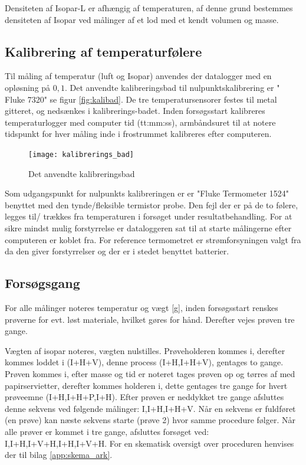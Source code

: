 Densiteten af Isopar-L er afhængig af temperaturen, af denne grund bestemmes densiteten af Isopar ved målinger af et lod med et kendt volumen og masse. 

\subsection{Kalibrering af temperaturfølere}
Til måling af temperatur (luft og Isopar) anvendes der datalogger med en opløsning på $0,1${\celsius}. Det anvendte kalibreringsbad til nulpunktskalibrering  er " Fluke 7320" se figur \vref{fig:kalibad}. De tre temperatursensorer festes til metal gitteret, og nedsænkes i kalibrerings-badet. Inden forsøgsstart kalibreres temperaturlogger med computer tid (tt:mm:ss), armbåndsuret til at notere tidspunkt for hver måling inde i frostrummet kalibreres efter computeren.

%
\begin{figure}
\centering
\texttt{[image: kalibrerings\_bad]}
\caption{Det anvendte kalibreringsbad}
\label{fig:kalibad}
\end{figure}
%

Som udgangspunkt for nulpunkts kalibreringen er er "Fluke Termometer 1524" benyttet med den tynde/fleksible termistor probe. Den fejl der er på de to følere, legges til/ trækkes fra temperaturen i forsøget under resultatbehandling.
For at sikre mindst mulig forstyrrelse er dataloggeren sat til at starte målingerne efter computeren er koblet fra. For reference termometret er strømforsyningen valgt fra da den giver forstyrrelser og der er i stedet benyttet batterier.

\subsection{Forsøgsgang}
For alle målinger noteres temperatur og vægt [g], inden forsøgsstart renskes prøverne for evt. løst materiale, hvilket gøres for hånd. Derefter vejes prøven tre gange.

Vægten af isopar noteres, vægten nulstilles. Prøveholderen kommes i, derefter kommes loddet i (I+H+V), denne process (I+H,I+H+V), gentages to gange. 
Prøven kommes i, efter masse og tid er noteret tages prøven op og tørres af med papirservietter, derefter kommes holderen i, dette gentages tre gange for hvert prøveemne (I+H,I+H+P,I+H).
Efter prøven er neddykket tre gange afsluttes denne sekvens ved følgende målinger: I,I+H,I+H+V. Når en sekvens er fuldføret (en prøve) kan næste sekvens starte (prøve 2) hvor samme procedure følger. Når alle prøver er kommet i tre gange, afsluttes forsøget ved: I,I+H,I+V+H,I+H,I+V+H. For en skematisk oversigt over proceduren henvises der til bilag \vref{app:skema_ark}.

